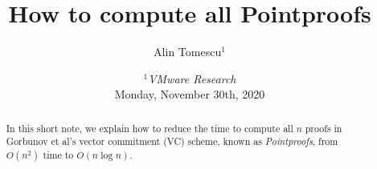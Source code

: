 \documentclass{llncs}
\title{\textbf{How to compute all Pointproofs}} %
\author{Alin Tomescu$^{1}$}
\date{%
{\small $^1$\textit{VMware Research}}\\[.5em]%
{\small Monday, November 30th, 2020}}
\author{}
\date{}                     %
\begin{document}
\maketitle

\ifEurocrypt
    \vspace{-5em}
\fi
\begin{abstract}
    In this short note, we explain how to reduce the time to compute all $n$ proofs in Gorbunov et al's vector commitment (VC) scheme, known as \textit{Pointproofs}, from $O(n^2)$ time to $O(n\log{n})$.
\end{abstract}







\ifEurocrypt
    
    {\footnotesize
    }
\else
    \clearpage
    
    
\fi


\ifNotEurocrypt
\fi
\end{document}
